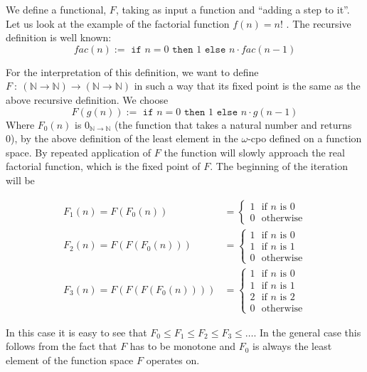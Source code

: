 \documentclass[11pt, leqno, titlepage]{article}
\theoremstyle{definition}
\begin{document}
We define a functional, $F$, taking as input a function and ``adding a step to it''.
Let us look at the example of the factorial function $f(n) = n!$ \cite{haskell}.
The recursive definition is well known:
$$fac(n) := \texttt{ if } n = 0 \texttt{ then }1\texttt{ else } n\cdot fac(n-1)$$

For the interpretation of this definition, we want to define $F~:~(\mathbb{N} \to
\mathbb{N}) \to (\mathbb{N} \to \mathbb{N})$ in such a way that its fixed point is
the same as the above recursive definition. We choose
$$F(g(n)):=\texttt{ if }n=0\texttt{ then }1\texttt{ else }n\cdot g(n-1)$$
Where $F_0(n)$ is $0_{\mathbb{N} \to \mathbb{N}}$ (the function that takes a natural
number and returns 0), by the above definition of the least element in the
$\omega$-cpo defined on a function space. By repeated application of $F$ the function
will slowly approach the real factorial function, which is the fixed point of $F$.
The beginning of the iteration will be

\begin{align*}
  F_1(n) = F(F_0(n)) & = \begin{cases}
                           1~~~\text{if }n\text{ is 0}\\
                           0~~~\text{otherwise}
                         \end{cases}
  \\
  F_2(n) = F(F(F_0(n))) & = \begin{cases}
                             1~~~\text{if }n\text{ is 0}\\
                             1~~~\text{if }n\text{ is 1}\\
                             0~~~\text{otherwise}
                           \end{cases}
  \\
  F_3(n) = F(F(F(F_0(n)))) & = \begin{cases}
                                1~~~\text{if }n\text{ is 0}\\
                                1~~~\text{if }n\text{ is 1}\\
                                2~~~\text{if }n\text{ is 2}\\
                                0~~~\text{otherwise}
                              \end{cases}
\end{align*}

In this case it is easy to see that $F_0 \leq F_1 \leq F_2 \leq F_3 \leq \dots$. In
the general case this follows from the fact that $F$ has to be monotone and $F_0$ is
always the least element of the function space $F$ operates on. 
\end{document}
